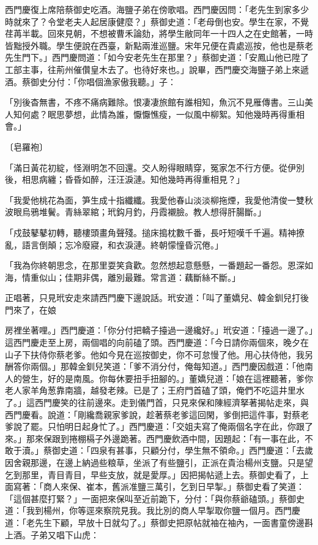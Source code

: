 西門慶復上席陪蔡御史吃酒。海鹽子弟在傍歌唱。西門慶因問：「老先生到家多少時就來了？令堂老夫人起居康健麼？」蔡御史道：「老母倒也安。學生在家，不覺荏苒半載。回來見朝，不想被曹禾論劾，將學生敝同年一十四人之在史館著，一時皆黜授外職。學生便說在西臺，新點兩淮巡鹽。宋年兄便在貴處巡按，他也是蔡老先生門下。」西門慶問道：「如今安老先生在那里？」蔡御史道：「安鳳山他已陞了工部主事，往荊州催儹皇木去了。也待好來也。」說畢，西門慶交海鹽子弟上來遞酒。蔡御史分付：「你唱個漁家傲我聽。」子：

「別後杳無書，不疼不痛病難除。恨凄凄旅館有誰相知，魚沉不見雁傳書。三山美人知何處？眠思夢想，此情為誰，懨懨憔瘦，一似風中柳絮。知他幾時再得重相會。」

〔皂羅袍〕

「滿日黃花初綻，怪淵明怎不回還。交人盼得眼睛穿，冤家怎不行方便。從伊別後，相思病纏；昏昏如醉，汪汪淚漣。知他幾時再得重相見？」

「我愛他桃花為面，笋生成十指纖纖。我愛他春山淡淡柳拖煙，我愛他清俊一雙秋波眼烏鴉堆鬢。青絲翠綰；玳鈎月釣，丹霞襯臉。教人想得肝腸斷。」

「戍鼓鼕鼕初轉，聽樓頭畫角聲殘。搥床搗枕數千番，長吁短嘆千千遍。精神撩亂，語言倒顛；忘冷廢寢，和衣淚漣。終朝懞憧昏沉倦。」

「我為你終朝思念，在那里耍笑貪歡。忽然想起意懸懸，一番題起一番怨。恩深如海，情重似山；佳期非偶，離別最難。常言道：藕斷絲不斷。」

正唱著，只見玳安走來請西門慶下邊說話。玳安道：「叫了董嬌兒、韓金釧兒打後門來了，在娘

房裡坐著哩。」西門慶道：「你分付把轎子擡過一邊纔好。」玳安道：「擡過一邊了。」這西門慶走至上房，兩個唱的向前磕了頭。西門慶道：「今日請你兩個來，晚夕在山子下扶侍你蔡老爹。他如今見在巡按御史，你不可怠慢了他。用心扶侍他，我另酬答你兩個。」那韓金釧兒笑道：「爹不消分付，俺每知道。」西門慶因戲道：「他南人的營生，好的是南風。你每休要扭手扭腳的。」董嬌兒道：「娘在這裡聽著，爹你老人家羊角葱靠南牆，越發老辣。已是了；王府門首磕了頭，俺們不吃這井里水了。」這西門慶笑的往前邊來。走到儀門首，只見來保和陳經濟拏著揭帖走來，與西門慶看。說道：「剛纔喬親家爹說，趁著蔡老爹這回閑，爹倒把這件事，對蔡老爹說了罷。只怕明日起身忙了。」西門慶道：「交姐夫寫了俺兩個名字在此，你跟了來。」那來保跟到捲棚槅子外邊跪著。西門慶飲酒中間，因題起：「有一事在此，不敢于瀆。」蔡御史道：「四泉有甚事，只顧分付，學生無不領命。」西門慶道：「去歲因舍親那邊，在邊上納過些粮草，坐派了有些鹽引，正派在貴治楊州支鹽。只是望乞到那里，青目青目，早些支放，就是愛厚。」因把揭帖遞上去。蔡御史看了，上面寫著：「商人來保、崔本，舊派准鹽三萬引，乞到日早掣。」蔡御史看了笑道：「這個甚麼打緊？」一面把來保叫至近前跪下，分付：「與你蔡爺磕頭。」蔡御史道：「我到楊州，你等逕來察院見我。我比別的商人早掣取你鹽一個月。西門慶道：「老先生下顧，早放十日就勾了。」蔡御史把原帖就袖在袖內，一面書童傍邊斟上酒。子弟又唱下山虎：

